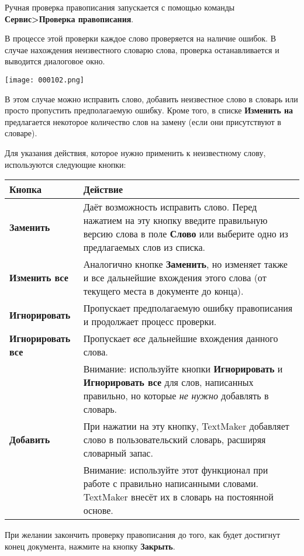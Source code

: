 ﻿\documentclass[a4paper,10pt]{article}
\begin{document}
Ручная проверка правописания запускается с помощью команды \textbf{Сервис>Проверка правописания}.

В процессе этой проверки каждое слово проверяется на наличие ошибок. В случае нахождения неизвестного словарю слова, проверка останавливается и выводится диалоговое окно.

\texttt{[image: 000102.png]}

В этом случае можно исправить слово, добавить неизвестное слово в словарь или просто пропустить предполагаемую ошибку. Кроме того, в списке \textbf{Изменить на} предлагается некоторое количество слов на замену (если они присутствуют в словаре).

Для указания действия, которое нужно применить к неизвестному слову, используются следующие кнопки:

\begin{center}
\begin{tabular}{  m{4cm}  m{12cm}  }
 \textbf{Кнопка} & \textbf{Действие}\\ 
 \hline
  \textbf{Заменить} & Даёт возможность исправить слово. Перед нажатием на эту кнопку введите правильную версию слова в поле \textbf{Слово} или выберите одно из предлагаемых слов из списка.\\
  \textbf{Изменить все} & Аналогично кнопке \textbf{Заменить}, но изменяет также и все дальнейшие вхождения этого слова (от текущего места в документе до конца).\\ 
\textbf{Игнорировать} & Пропускает предполагаемую ошибку правописания и продолжает процесс проверки.\\
\textbf{Игнорировать все} & Пропускает \textit{все} дальнейшие вхождения данного слова.\\

 & Внимание: используйте кнопки \textbf{Игнорировать} и \textbf{Игнорировать все} для слов, написанных правильно, но которые \textit{не нужно} добавлять в словарь.\\
 \textbf{Добавить} & При нажатии на эту кнопку, TextMaker добавляет слово в пользовательский словарь, расширяя словарный запас.\\
  & Внимание: используйте этот функционал при работе с правильно написанными словами. TextMaker внесёт их в словарь на постоянной основе.
\end{tabular}
\end{center}

При желании закончить проверку правописания до того, как будет достигнут конец документа, нажмите на кнопку \textbf{Закрыть}.
\end{document}
